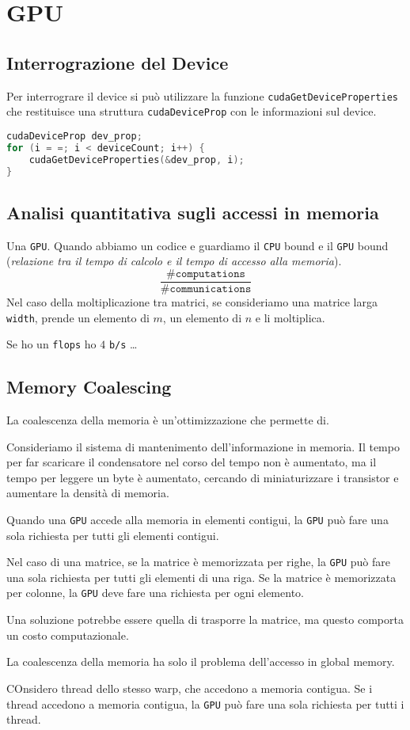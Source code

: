\chapter{GPU}
\section{Interrograzione del Device}
Per interrograre il device si può utilizzare la funzione \texttt{cudaGetDeviceProperties}
che restituisce una struttura \texttt{cudaDeviceProp} con le informazioni sul device.\\
\begin{lstlisting}[language=C]
cudaDeviceProp dev_prop;
for (i = =; i < deviceCount; i++) {
    cudaGetDeviceProperties(&dev_prop, i);
}
\end{lstlisting}
\section{Analisi quantitativa sugli accessi in memoria}
Una \texttt{GPU}. Quando abbiamo un codice e guardiamo il 
\texttt{CPU} bound e il \texttt{GPU} bound (\textit{relazione tra il tempo di calcolo e
il tempo di accesso alla memoria}).\\
\[
  \frac{\# \texttt{computations}}{\# \texttt{communications}}
\]
Nel caso della moltiplicazione tra matrici, se consideriamo una 
matrice larga \texttt{width}, prende un elemento di $m$, un 
elemento di $n$ e li moltiplica.

Se ho un \texttt{flops} ho $4$ \texttt{b/s} 
\dots

\section{Memory Coalescing}
La coalescenza della memoria è un'ottimizzazione che
permette di.

Consideriamo il sistema di mantenimento dell'informazione 
in memoria. 
Il tempo per far scaricare il condensatore nel corso del tempo 
non è aumentato, ma il tempo per leggere un byte è aumentato, 
cercando di miniaturizzare i transistor e aumentare la densità 
di memoria.

Quando una \texttt{GPU} accede alla memoria in elementi contigui,
la \texttt{GPU} può fare una sola richiesta per tutti gli elementi
contigui.

Nel caso di una matrice, se la matrice è memorizzata per righe,
la \texttt{GPU} può fare una sola richiesta per tutti gli elementi
di una riga. Se la matrice è memorizzata per colonne, la \texttt{GPU}
deve fare una richiesta per ogni elemento.

Una soluzione potrebbe essere quella di trasporre la matrice,
ma questo comporta un costo computazionale.

La coalescenza della memoria ha solo il problema dell'accesso in 
global memory. 

COnsidero thread dello stesso warp, che accedono a memoria
contigua. Se i thread accedono a memoria contigua, la \texttt{GPU}
può fare una sola richiesta per tutti i thread.